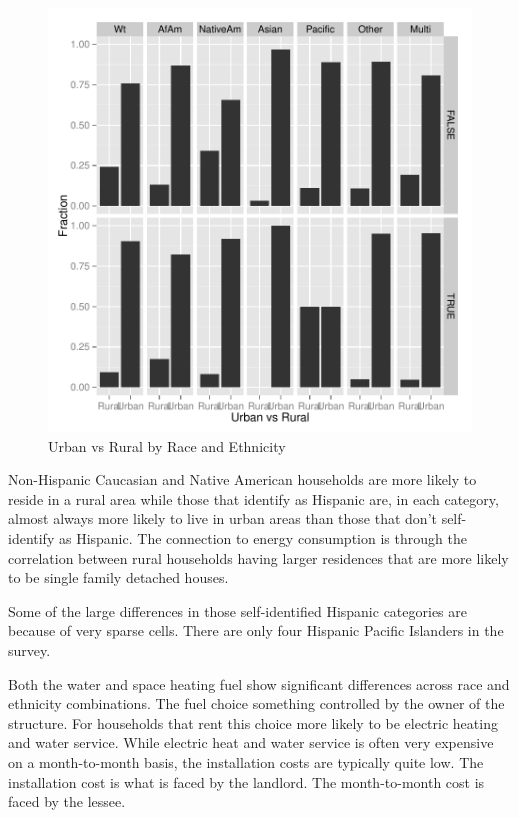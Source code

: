 \documentclass{article}
\begin{document}
\begin{figure}[htbp]
\begin{center}
\caption{Urban vs Rural by Race and Ethnicity}
\label{fig:UrbanRural}
\includegraphics{DraftEdwardsWoods-006}
\end{center}
\end{figure}

Non-Hispanic Caucasian and Native American households are more likely to reside in a rural area while those that identify as Hispanic are, in each category, almost always more likely to live in urban areas than those that don't self-identify as Hispanic.  The connection to energy consumption is through the correlation between rural households having larger residences that are more likely to be single family detached houses. 

Some of the large differences in those self-identified Hispanic categories are because of very sparse cells.  There are only four Hispanic Pacific Islanders in the survey.

Both the water and space heating fuel show significant differences across race and ethnicity combinations.  The fuel choice something controlled by the owner of the structure.  For households that rent this choice more likely to be electric heating and water service.  While electric heat and water service is often very expensive on a month-to-month basis, the installation costs are typically quite low.  The installation cost is what is faced by the landlord.  The month-to-month cost is faced by the lessee.
\end{document}
